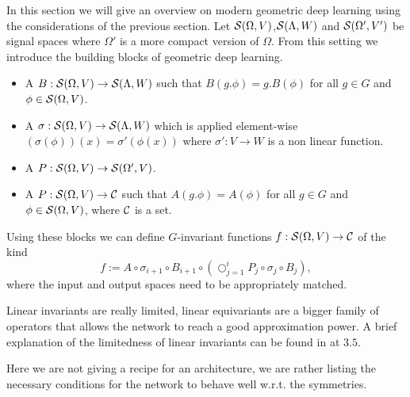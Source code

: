 \documentclass[../3.tex]{subfiles}
\begin{document}
    In this section we will give an overview on modern geometric deep learning using the considerations of the previous section.
    Let $\mathcal{S}(\Omega,V)$,$\mathcal{S}(\Lambda,W)$ and $\mathcal{S}(\Omega',V')$ be signal spaces where {\color{red} $\Omega'$ is a more compact version of $\Omega$}.
    From this setting we introduce the building blocks of geometric deep learning.

    \begin{itemize}
        \item A  $B : \mathcal{S}(\Omega,V) \to \mathcal{S}(\Lambda,W)$ such that
            $B(g.\phi) = g.B(\phi)$ for all $g \in G$ and $\phi \in \mathcal{S}(\Omega,V)$.
        \item A  $\sigma : \mathcal{S}(\Omega,V) \to \mathcal{S}(\Lambda,W)$ which is applied element-wise 
            $(\sigma(\phi))(x) = \sigma'(\phi(x))$ where $\sigma' : V \to W$ is a non linear function.
        \item A  $P : \mathcal{S}(\Omega,V) \to \mathcal{S}(\Omega',V)$.
        \item A  $P : \mathcal{S}(\Omega,V) \to \mathcal{C}$ such that $A(g.\phi) = A(\phi)$ for all $g \in G$ 
        and $\phi \in \mathcal{S}(\Omega,V)$, where $\mathcal{C}$ is a set.
    \end{itemize}

    Using these blocks we can define $G$-invariant functions $f : \mathcal{S}(\Omega,V) \to \mathcal{C}$ of the kind
    \[ f := A \circ \sigma_{i+1} \circ B_{i+1} \circ (\bigcirc_{j = 1}^i P_j \circ \sigma_j \circ B_j ) , \]
    where the input and output spaces need to be appropriately matched.


    Linear invariants are really limited, linear equivariants are a bigger family of operators that allows the network to reach a good approximation
    power. A brief explanation of the limitedness of linear invariants can be found in \cite{2021geo} at $3.5$.
    
    Here we are not giving a recipe for an architecture, we are rather listing the necessary conditions for the network to behave well w.r.t. the symmetries.
\end{document}
